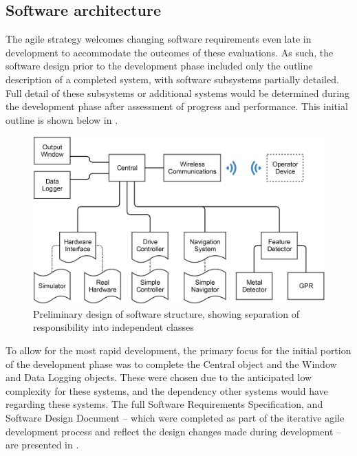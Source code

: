 \documentclass[main.tex]{subfiles}
\begin{document}
\subsection{Software architecture}
 The agile strategy welcomes changing software requirements even late in development to accommodate the outcomes of these evaluations.
As such, the software design prior to the development phase included only the outline description of a completed system, with software subsystems partially detailed. Full detail of these subsystems or additional systems would be determined during the development phase after assessment of progress and performance. This initial outline is shown below in .

\begin{figure}[!ht]
\includegraphics[width=1\textwidth]{4-DetailedDesign/fyp_structure__1_.png}
\centering
\caption[Preliminary software structure design]{Preliminary design of software structure, showing separation of responsibility into independent classes} 
\end{figure}

To allow for the most rapid development, the primary focus for the initial portion of the development phase was to complete the Central object and the Window and Data Logging objects. These were chosen due to the anticipated low complexity for these systems, and the dependency other systems would have regarding these systems. The full Software Requirements Specification, and Software Design Document – which were completed as part of the iterative agile development process and reflect the design changes made during development – are presented in .
\end{document}
